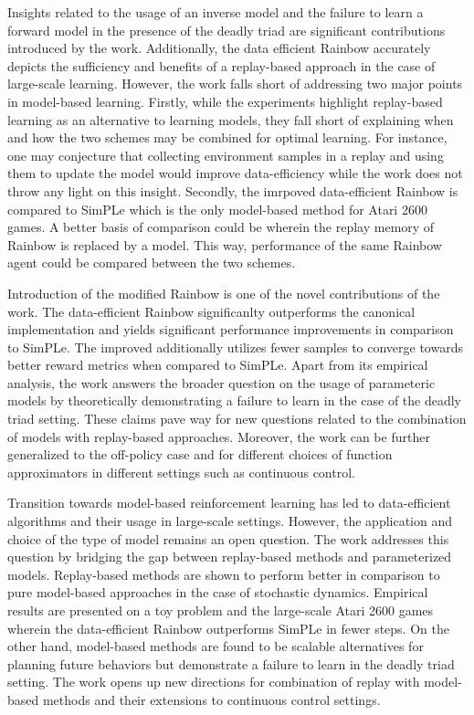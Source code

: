 \documentclass[10pt,letterpaper]{article}
\begin{document}
Insights related to the usage of an inverse model and the failure to learn a forward model in the presence of the deadly triad are significant contributions introduced by the work. Additionally, the data efficient Rainbow accurately depicts the sufficiency and benefits of a replay-based approach in the case of large-scale learning. However, the work falls short of addressing two major points in model-based learning. Firstly, while the experiments highlight replay-based learning as an alternative to learning models, they fall short of explaining when and how the two schemes may be combined for optimal learning. For instance, one may conjecture that collecting environment samples in a replay and using them to update the model would improve data-efficiency while the work does not throw any light on this insight. Secondly, the imrpoved data-efficient Rainbow is compared to SimPLe which is the only model-based method for Atari 2600 games. A better basis of comparison could be wherein the replay memory of Rainbow is replaced by a model. This way, performance of the same Rainbow agent could be compared between the two schemes. 

Introduction of the modified Rainbow is one of the novel contributions of the work. The data-efficient Rainbow significanlty outperforms the canonical implementation and yields significant performance improvements in comparison to SimPLe. The improved additionally utilizes fewer samples to converge towards better reward metrics when compared to SimPLe. Apart from its empirical analysis, the work answers the broader question on the usage of parameteric models by theoretically demonstrating a failure to learn in the case of the deadly triad setting. These claims pave way for new questions related to the combination of models with replay-based approaches. Moreover, the work can be further generalized to the off-policy case and for different choices of function approximators in different settings such as continuous control. 

Transition towards model-based reinforcement learning has led to data-efficient algorithms and their usage in large-scale settings. However, the application and choice of the type of model remains an open question. The work addresses this question by bridging the gap between replay-based methods and parameterized models. Replay-based methods are shown to perform better in comparison to pure model-based approaches in the case of stochastic dynamics. Empirical results are presented on a toy problem and the large-scale Atari 2600 games wherein the data-efficient Rainbow outperforms SimPLe in fewer steps. On the other hand, model-based methods are found to be scalable alternatives for planning future behaviors but demonstrate a failure to learn in the deadly triad setting. The work opens up new directions for combination of replay with model-based methods and their extensions to continuous control settings.
\end{document}
